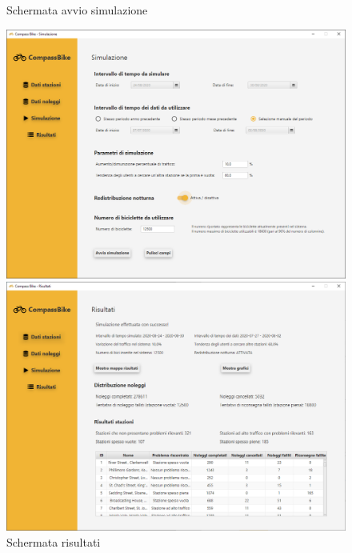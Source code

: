 \documentclass[a4paper, 12pt]{article}
\begin{document}
	\begin{figure}[H]
	\caption{Schermata avvio simulazione}
	\label{simulation}
	\hfill \includegraphics[height=0.47\textheight]{resources/images/screenshot/Simulation.png} \hspace*{\fill}

	\caption{Schermata risultati}
	\label{result}
	\hfill \includegraphics[height=0.47\textheight]{resources/images/screenshot/Result.png} \hspace*{\fill}
	\end{figure}	
\end{document}

